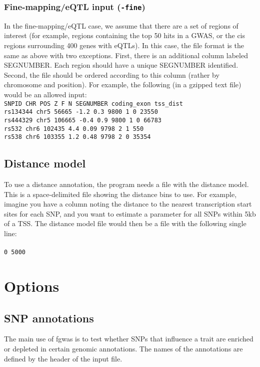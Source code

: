\documentclass[11pt,titlepage]{article}
\begin{document}
\subsubsection{Fine-mapping/eQTL input (\texttt{-fine})} \label{finemap}
In the fine-mapping/eQTL case, we assume that there are a set of regions of interest (for example, regions containing the top 50 hits in a GWAS, or the cis regions surrounding 400 genes with eQTLs). In this case, the file format is the same as above with two exceptions. First, there is an additional column labeled SEGNUMBER. Each region should have a unique SEGNUMBER identified. Second, the file should be ordered according to this column (rather by chromosome and position). For example, the following (in a gzipped text file) would be an allowed input:
\\

\noindent \texttt{SNPID CHR POS Z F N SEGNUMBER coding\_exon tss\_dist}\\
\texttt{rs134344 chr5 56665 -1.2 0.3 9800 1 0 23550}\\
\texttt{rs444329 chr5 106665 -0.4 0.9 9800  1 0 66783}\\
\texttt{rs532 chr6 102435 4.4 0.09 9798 2 1 550}\\
\texttt{rs538 chr6 103355 1.2 0.48 9798 2 0 35354}

\subsection{Distance model} \label{dist_input}
To use a distance annotation, the program needs a file with the distance model. This is a space-delimited file showing the distance bins to use. For example, imagine you have a column noting the distance to the nearest transcription start sites for each SNP, and you want to estimate a parameter for all SNPs within 5kb of a TSS. The distance model file would then be a file with the following single line:
\\
\\
\noindent \texttt{0 5000} \\
\section{Options}
\subsection{SNP annotations}
The main use of fgwas is to test whether SNPs that influence a trait are enriched or depleted in certain genomic annotations. The names of the annotations are defined by the header of the input file.
\end{document}
